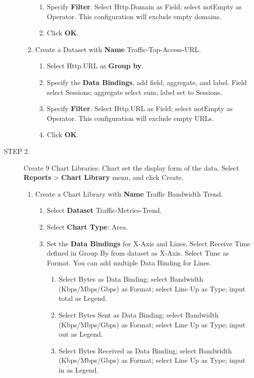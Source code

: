 \begin{description}
\begin{enumerate}
\begin{enumerate}
            \item	Specify \textbf{Filter}. Select Http.Domain as Field; select notEmpty as Operator. This configuration will exclude empty domains. 
            \item	Click \textbf{OK}.
        \end{enumerate}
        \item Create a Dataset with \textbf{Name} Traffic-Top-Access-URL.
        \begin{enumerate}
            \item	Select Http.URL as \textbf{Group by}.
            \item	Specify the \textbf{Data Bindings}, add field, aggregate, and label. Field select Sessions; aggregate select sum; label set to Sessions.
            \item	Specify \textbf{Filter}. Select Http.URL as Field; select notEmpty as Operator. This configuration will exclude empty URLs. 
            \item	Click \textbf{OK}.
        \end{enumerate}
    \end{enumerate}
    \item[STEP 2.]	 Create 9 Chart Libraries. Chart set the display form of the data. Select \textbf{Reports} > \textbf{Chart Library} menu, and click Create.
    \begin{enumerate}
        \item 	Create a Chart Library with \textbf{Name} Traffic Bandwidth Trend.
        \begin{enumerate}
            \item 	Select \textbf{Dataset} Traffic-Metrics-Trend.
            \item 	Select \textbf{Chart Type}: Area.
            \item 	Set the \textbf{Data Bindings} for X-Axis and Lines. Select Receive Time defined in Group By from dataset as X-Axis. Select Time as Format. You can add multiple Data Binding for Lines.
            \begin{enumerate}
                \item	Select Bytes as Data Binding; select Bandwidth (Kbps/Mbps/Gbps) as Format; select Line Up as Type; input total as Legend. 
                \item	Select Bytes Sent as Data Binding; select Bandwidth (Kbps/Mbps/Gbps) as Format; select Line Up as Type; input out as Legend.
                \item	 Select Bytes Received as Data Binding; select Bandwidth (Kbps/Mbps/Gbps) as Format; select Line Up as Type; input in as Legend.

\end{enumerate}
\end{enumerate}
\end{enumerate}
\end{description}
